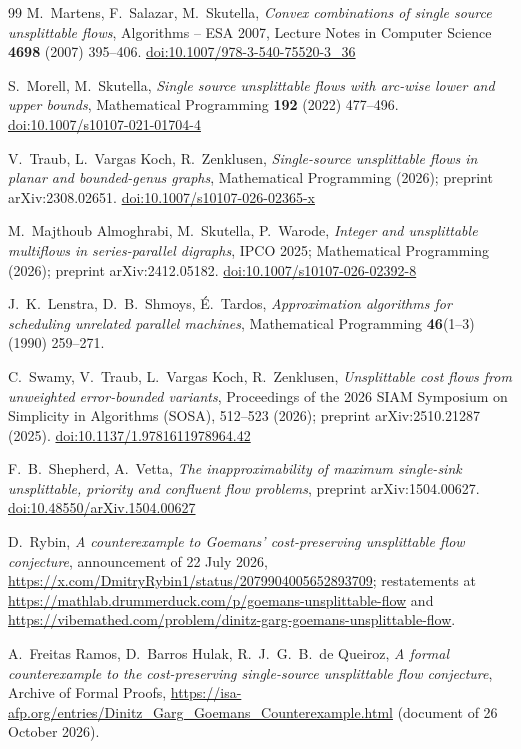 \documentclass[11pt]{article}
\theoremstyle{remark}
\newcommand{\doi}[1]{\href{https://doi.org/#1}{doi:#1}}
\begin{document}
{\begin{thebibliography}{99}
 M.\ Martens, F.\ Salazar, M.\ Skutella, \emph{Convex combinations of single source unsplittable flows}, Algorithms -- ESA 2007, Lecture Notes in Computer Science \textbf{4698} (2007) 395--406. \doi{10.1007/978-3-540-75520-3\_36}

 S.\ Morell, M.\ Skutella, \emph{Single source unsplittable flows with arc-wise lower and upper bounds}, Mathematical Programming \textbf{192} (2022) 477--496. \doi{10.1007/s10107-021-01704-4}

 V.\ Traub, L.\ Vargas Koch, R.\ Zenklusen, \emph{Single-source unsplittable flows in planar and bounded-genus graphs}, Mathematical Programming (2026); preprint arXiv:2308.02651. \doi{10.1007/s10107-026-02365-x}

 M.\ Majthoub Almoghrabi, M.\ Skutella, P.\ Warode, \emph{Integer and unsplittable multiflows in series-parallel digraphs}, IPCO 2025; Mathematical Programming (2026); preprint arXiv:2412.05182. \doi{10.1007/s10107-026-02392-8}

 J.\ K.\ Lenstra, D.\ B.\ Shmoys, \'E.\ Tardos, \emph{Approximation algorithms for scheduling unrelated parallel machines}, Mathematical Programming \textbf{46}(1--3) (1990) 259--271.

 C.\ Swamy, V.\ Traub, L.\ Vargas Koch, R.\ Zenklusen, \emph{Unsplittable cost flows from unweighted error-bounded variants}, Proceedings of the 2026 SIAM Symposium on Simplicity in Algorithms (SOSA), 512--523 (2026); preprint arXiv:2510.21287 (2025). \doi{10.1137/1.9781611978964.42}

 F.\ B.\ Shepherd, A.\ Vetta, \emph{The inapproximability of maximum single-sink unsplittable, priority and confluent flow problems}, preprint arXiv:1504.00627. \doi{10.48550/arXiv.1504.00627}

 D.\ Rybin, \emph{A counterexample to Goemans' cost-preserving unsplittable flow conjecture}, announcement of 22 July 2026, \url{https://x.com/DmitryRybin1/status/2079904005652893709}; restatements at \url{https://mathlab.drummerduck.com/p/goemans-unsplittable-flow} and \url{https://vibemathed.com/problem/dinitz-garg-goemans-unsplittable-flow}.

 A.\ Freitas Ramos, D.\ Barros Hulak, R.\ J.\ G.\ B.\ de Queiroz, \emph{A formal counterexample to the cost-preserving single-source unsplittable flow conjecture}, Archive of Formal Proofs, \url{https://isa-afp.org/entries/Dinitz_Garg_Goemans_Counterexample.html} (document of 26 October 2026).


\end{thebibliography}}
\end{document}
